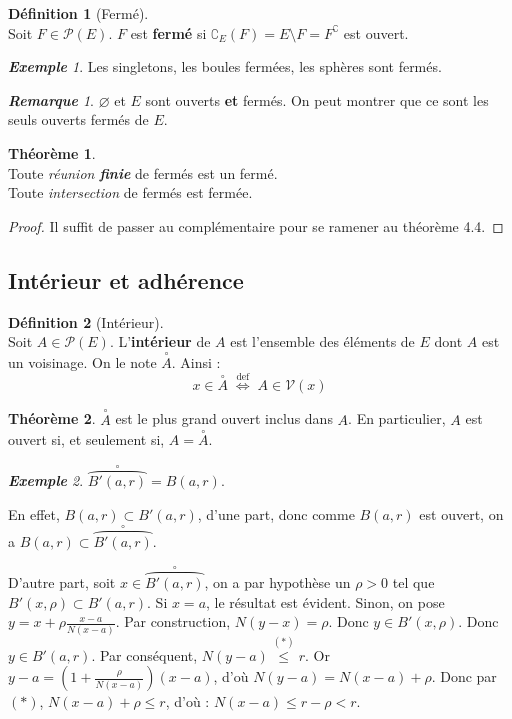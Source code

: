 \documentclass[12pt]{book}
\newcommand{\interieur}[1]{\ensuremath{\overset{\circ\!}{#1}}}
\theoremstyle{definition}
\newtheorem*{defi}{Définition}
\newtheorem{thme}{Théorème}[chapter]
\theoremstyle{remark}
\newtheorem*{rem}{\textbf{Remarque}}
\newtheorem*{ex}{\textbf{Exemple}}
\newenvironment{fdef}
  {\begin{mdframed}[roundcorner=10pt, linewidth=1pt]\begin{defi}}
  {\end{defi}\end{mdframed}}
\newenvironment{fthme}
  {\begin{mdframed}[roundcorner=10pt, linewidth=2pt]\begin{thme}}
  {\end{thme}\end{mdframed}}
\begin{document}
	\begin{fdef}[Fermé]\mbox{~}\\
	Soit $F \in \mathcal P(E)$. $F$ est \textbf{fermé} si $\complement_E(F) = E \setminus F = F^\complement$ est ouvert.
	\end{fdef}
	
	\begin{ex}
	Les singletons, les boules fermées, les sphères sont fermés.
	\end{ex}
	
	\begin{rem}
	$\varnothing$ et $E$ sont ouverts \textbf{et} fermés. On peut montrer que ce sont les seuls ouverts fermés de $E$.
	\end{rem}
	
	\begin{fthme}\mbox{~}\\
	Toute \textit{réunion \textbf{finie}} de fermés est un fermé.\\
	Toute \textit{intersection} de fermés est fermée.
	\end{fthme}
	\begin{proof}
	Il suffit de passer au complémentaire pour se ramener au théorème 4.4.
	\end{proof}\newpage
	
	\subsection{Intérieur et adhérence}
	\begin{fdef}[Intérieur]\mbox{~}\\
	Soit $A \in \mathcal P(E)$. L'\textbf{intérieur} de $A$ est l'ensemble des éléments de $E$ dont $A$ est un voisinage. On le note $\interieur {A}$. Ainsi :
	\[ x \in \interieur A \; \overset{\mathrm{def}}{\Longleftrightarrow} \; A \in \mathcal V(x)\]
	\end{fdef}
	
	\begin{fthme}
	$\interieur A$ est le plus grand ouvert inclus dans $A$. En particulier, $A$ est ouvert si, et seulement si, $A = \interieur A$.
	\end{fthme}
	
	\begin{ex}
	$\interieur {\wideparen{B'(a,r)}} = B(a,r)$.
	
	En effet, $B(a,r) \subset B'(a,r)$, d'une part, donc comme $B(a,r)$ est ouvert, on a $B(a,r) \subset \interieur {\wideparen{B'(a,r)}}$.
	
	D'autre part, soit $x \in \interieur {\wideparen{B'(a,r)}}$, on a par hypothèse un $\rho > 0$ tel que $B'(x,\rho) \subset B'(a,r)$. Si $x = a$, le résultat est évident. Sinon, on pose $y = x + \rho \frac{x-a}{N(x-a)}$. Par construction, $N(y-x) = \rho$. Donc $y \in B'(x,\rho)$. Donc $y \in B'(a,r)$. Par conséquent, $N(y-a) \overset{(*)}{\leq} r$. Or $y-a = \left( 1 + \frac{\rho}{N(x-a)} \right) (x-a)$, d'où $N(y-a) = N(x-a) + \rho$. Donc par $(*)$, $N(x-a) + \rho \leq r$, d'où : $N(x-a) \leq r - \rho < r$.
	\end{ex}
	
\end{document}
